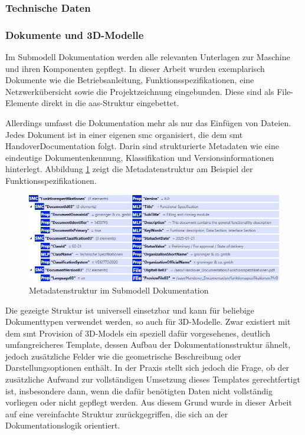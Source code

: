 \subsubsection*{Technische Daten}
\vspace{-0.5em}


\subsubsection*{Dokumente und 3D-Modelle}
\vspace{-0.5em}
Im Submodell Dokumentation werden alle relevanten Unterlagen zur Maschine und ihren Komponenten gepflegt.
In dieser Arbeit wurden exemplarisch Dokumente wie die Betriebsanleitung, Funktionsspezifikationen, eine Netzwerkübersicht sowie die Projektzeichnung eingebunden.
Diese sind als File-Elemente direkt in die \acs{aas}-Struktur eingebettet.

Allerdings umfasst die Dokumentation mehr als nur das Einfügen von Dateien.
Jedes Dokument ist in einer eigenen \acs{smc} organisiert, die dem \acs{smt} HandoverDocumentation \cite{SpezifikationDokumentation} folgt.
Darin sind strukturierte Metadaten wie eine eindeutige Dokumentenkennung, Klassifikation und Versionsinformationen hinterlegt.
Abbildung \ref{fig:Doku} zeigt die Metadatenstruktur am Beispiel der Funktionsspezifikationen.

\begin{figure}[htbp]
    \centering
        \includegraphics[width=1\textwidth]{Bilder/Ergebnisse/StatischeDaten/Doku.png}
    \caption{Metadatenstruktur im Submodell Dokumentation}
    \label{fig:Doku}
\end{figure}

Die gezeigte Struktur ist universell einsetzbar und kann für beliebige Dokumenttypen verwendet werden, so auch für 3D-Modelle.
Zwar existiert mit dem \acs{smt} Provision of 3D-Models \cite{Spezifikation3DModelle} ein speziell dafür vorgesehenes, deutlich umfangreicheres Template, dessen Aufbau der Dokumentationsstruktur ähnelt, jedoch zusätzliche Felder wie die geometrische Beschreibung oder Darstellungsoptionen enthält.
In der Praxis stellt sich jedoch die Frage, ob der zusätzliche Aufwand zur vollständigen Umsetzung dieses Templates gerechtfertigt ist, insbesondere dann, wenn die dafür benötigten Daten nicht vollständig vorliegen oder nicht gepflegt werden.
Aus diesem Grund wurde in dieser Arbeit auf eine vereinfachte Struktur zurückgegriffen, die sich an der Dokumentationslogik orientiert.

